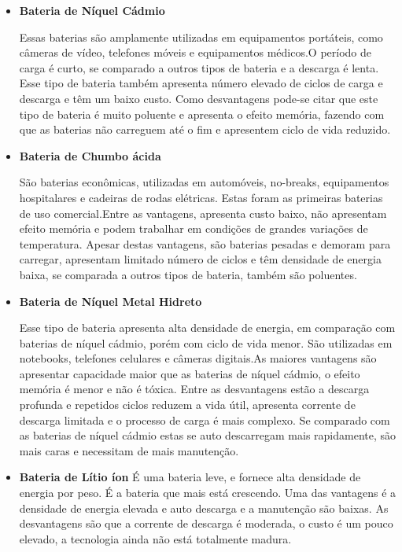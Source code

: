 \begin{itemize} 

\item\textbf {Bateria de Níquel Cádmio}

\par Essas baterias são amplamente utilizadas em equipamentos portáteis, como câmeras de vídeo, telefones móveis e equipamentos médicos.O período de carga é curto, se comparado a outros tipos de bateria e a descarga é lenta. Esse tipo de bateria também apresenta número elevado de ciclos de carga e descarga e têm um baixo custo. Como desvantagens pode-se citar que este tipo de bateria é muito poluente e apresenta o efeito memória, fazendo com que as baterias não carreguem até o fim e apresentem ciclo de vida reduzido.


\item\textbf {Bateria de Chumbo ácida} 
\par São baterias econômicas, utilizadas em automóveis, no-breaks, equipamentos hospitalares e cadeiras de rodas elétricas. Estas foram as primeiras baterias de uso comercial.Entre as vantagens, apresenta 
custo baixo, não apresentam efeito memória e podem trabalhar em condições de grandes variações de temperatura. Apesar destas vantagens, são baterias pesadas e demoram para carregar, apresentam limitado número de ciclos e têm densidade de energia baixa, se comparada a outros tipos de bateria, também são poluentes.
 

\item \textbf{ Bateria de Níquel Metal Hidreto}
\par Esse tipo de bateria apresenta alta densidade de energia, em comparação com baterias de níquel cádmio, porém com ciclo de vida menor. São utilizadas em notebooks, telefones celulares e câmeras digitais.As maiores vantagens são apresentar capacidade maior que as baterias de níquel cádmio, o efeito memória é menor e não é tóxica. Entre as desvantagens estão a descarga profunda e repetidos ciclos reduzem a vida útil, apresenta corrente de descarga limitada e o processo de carga é mais complexo. Se comparado com as baterias de níquel cádmio estas se auto descarregam mais rapidamente, são mais caras e necessitam de mais manutenção. 


\item\textbf{Bateria de Lítio íon}
É uma bateria leve, e fornece alta densidade de energia por peso. É a bateria que mais está crescendo. Uma das vantagens é a densidade de energia elevada e auto descarga e a manutenção são baixas. As desvantagens são que a corrente de descarga é moderada, o custo é um pouco elevado, a tecnologia ainda não está totalmente madura. 
\end{itemize}


